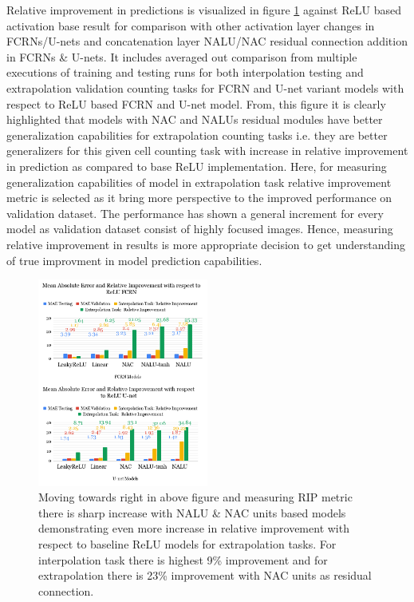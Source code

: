 \documentclass[conference]{IEEEtran}
\begin{document}
Relative improvement in predictions is visualized in figure \ref{fig10} against ReLU based activation base result for comparison with other activation layer changes in FCRNs/U-nets and concatenation layer NALU/NAC residual connection addition in FCRNs \& U-nets. It includes averaged out comparison from multiple executions of training and testing runs for both interpolation testing and extrapolation validation counting tasks for FCRN and U-net variant models with respect to ReLU based FCRN and U-net model. From, this figure it is clearly highlighted that models with NAC and NALUs residual modules have better generalization capabilities for extrapolation counting tasks i.e. they are better generalizers for this given cell counting task with increase in relative improvement in prediction as compared to base ReLU implementation. Here, for measuring generalization capabilities of model in extrapolation task relative improvement metric is selected as it bring more perspective to the improved performance on validation dataset. The performance has shown a general increment for every model as validation dataset consist of highly focused images. Hence, measuring relative improvement in results is more appropriate decision to get understanding of true improvment in model prediction capabilities.

\begin{figure}[!h]
\centering
\includegraphics[width=0.50\textwidth]{merged-relative-improv-results.png}
\caption{Moving towards right in above figure and measuring RIP metric there is sharp increase with NALU \& NAC units based models demonstrating even more increase in relative improvement with respect to baseline ReLU models for extrapolation tasks. For interpolation task there is highest 9\% improvement and for extrapolation there is 23\% improvement with NAC units as residual connection.}
\label{fig10}
\end{figure}
\end{document}
